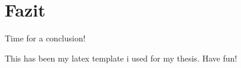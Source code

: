 \documentclass[../Main/main.tex]{subfiles}
\begin{document}
\chapter{Fazit}

Time for a conclusion!

This has been my latex template i used for my thesis. Have fun!
\end{document}
